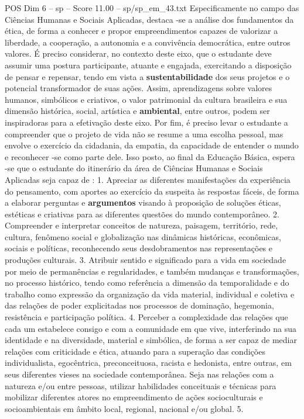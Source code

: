 \begin{textsample}{POS Dim 6 – sp – Score 11.00 – sp/sp\_em\_43.txt}
Especificamente no campo das Ciências Humanas e Sociais Aplicadas, destaca -se a análise dos fundamentos da ética, de forma a conhecer e propor empreendimentos capazes de valorizar a liberdade, a cooperação, a autonomia e a convivência democrática, entre outros valores.
É preciso considerar, no contexto deste eixo, que o estudante deve assumir uma postura participante, atuante e engajada, exercitando a disposição de pensar e repensar, tendo em vista a \textbf{sustentabilidade} dos seus projetos e o potencial transformador de suas ações.
Assim, aprendizagens sobre valores humanos, simbólicos e criativos, o valor patrimonial da cultura brasileira e sua dimensão histórica, social, artística e \textbf{ambiental}, entre outros, podem ser inspiradoras para a efetivação deste eixo.
Por fim, é preciso levar o estudante a compreender que o projeto de vida não se resume a uma escolha pessoal, mas envolve o exercício da cidadania, da empatia, da capacidade de entender o mundo e reconhecer -se como parte dele.
Isso posto, ao final da Educação Básica, espera -se que o estudante do itinerário da área de Ciências Humanas e Sociais Aplicadas seja capaz de : 1.
Apreciar as diferentes manifestações da experiência do pensamento, com aportes ao exercício da suspeita às respostas fáceis, de forma a elaborar perguntas e \textbf{argumentos} visando à proposição de soluções éticas, estéticas e criativas para as diferentes questões do mundo contemporâneo. 2.
Compreender e interpretar conceitos de natureza, paisagem, território, rede, cultura, fenômeno social e globalização nas dinâmicas históricas, econômicas, sociais e políticas, reconhecendo seus desdobramentos nas representações e produções culturais. 3.
Atribuir sentido e significado para a vida em sociedade por meio de permanências e regularidades, e também mudanças e transformações, no processo histórico, tendo como referência a dimensão da temporalidade e do trabalho como expressão da organização da vida material, individual e coletiva e das relações de poder explicitadas nos processos de dominação, hegemonia, resistência e participação política. 4.
Perceber a complexidade das relações que cada um estabelece consigo e com a comunidade em que vive, interferindo na sua identidade e na diversidade, material e simbólica, de forma a ser capaz de mediar relações com criticidade e ética, atuando para a superação das condições individualista, egocêntrica, preconceituosa, racista e hedonista, entre outras, em seus diferentes vieses na sociedade contemporânea.
Seja nas relações com a natureza e/ou entre pessoas, utilizar habilidades conceituais e técnicas para mobilizar diferentes atores no empreendimento de ações socioculturais e socioambientais em âmbito local, regional, nacional e/ou global. 5.

\end{textsample}
